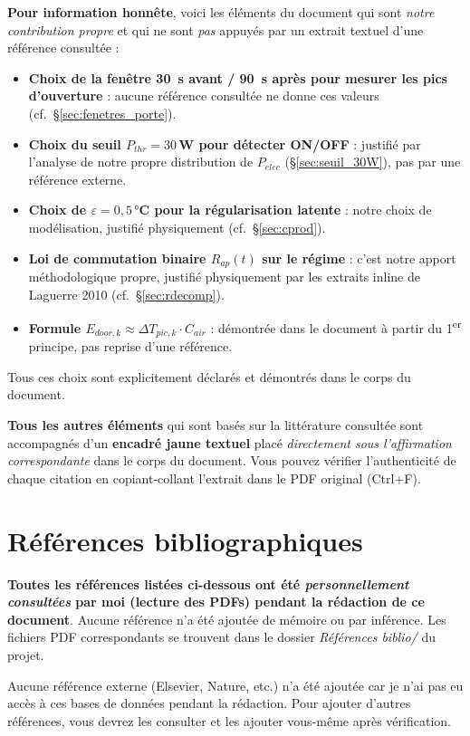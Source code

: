 \documentclass[11pt,a4paper]{article}
\begin{document}
\begin{honnete}
\textbf{Pour information honnête}, voici les éléments du document qui sont \emph{notre
contribution propre} et qui ne sont \emph{pas} appuyés par un extrait textuel d'une
référence consultée :
\begin{itemize}[itemsep=4pt]
\item \textbf{Choix de la fenêtre 30~s avant / 90~s après pour mesurer les pics
d'ouverture} : aucune référence consultée ne donne ces valeurs (cf.\ §\ref{sec:fenetres_porte}).
\item \textbf{Choix du seuil $P_{thr} = 30\,$W pour détecter ON/OFF} : justifié par
l'analyse de notre propre distribution de $P_{elec}$ (§\ref{sec:seuil_30W}), pas par une
référence externe.
\item \textbf{Choix de $\varepsilon = 0{,}5\,°$C pour la régularisation latente} :
notre choix de modélisation, justifié physiquement (cf.\ §\ref{sec:cprod}).
\item \textbf{Loi de commutation binaire $R_{ap}(t)$ sur le régime} : c'est notre apport
méthodologique propre, justifié physiquement par les extraits inline de Laguerre 2010
(cf.\ \S\ref{sec:rdecomp}).
\item \textbf{Formule $E_{door,k} \approx \Delta T_{pic,k} \cdot C_{air}$} : démontrée
dans le document à partir du 1\textsuperscript{er} principe, pas reprise d'une référence.
\end{itemize}
Tous ces choix sont explicitement déclarés et démontrés dans le corps du document.

\textbf{Tous les autres éléments} qui sont basés sur la littérature consultée sont
accompagnés d'un \textbf{encadré jaune textuel} placé \emph{directement sous l'affirmation
correspondante} dans le corps du document. Vous pouvez vérifier l'authenticité de chaque
citation en copiant-collant l'extrait dans le PDF original (Ctrl+F).
\end{honnete}

\section{Références bibliographiques}\label{sec:references}

\begin{honnete}
\textbf{Toutes les références listées ci-dessous ont été \emph{personnellement consultées}
par moi (lecture des PDFs) pendant la rédaction de ce document}. Aucune référence n'a été
ajoutée de mémoire ou par inférence. Les fichiers PDF correspondants se trouvent dans le
dossier \emph{Références biblio/} du projet.

Aucune référence externe (Elsevier, Nature, etc.) n'a été ajoutée car je n'ai pas eu accès
à ces bases de données pendant la rédaction. Pour ajouter d'autres références, vous
devrez les consulter et les ajouter vous-même après vérification.
\end{honnete}
\end{document}
